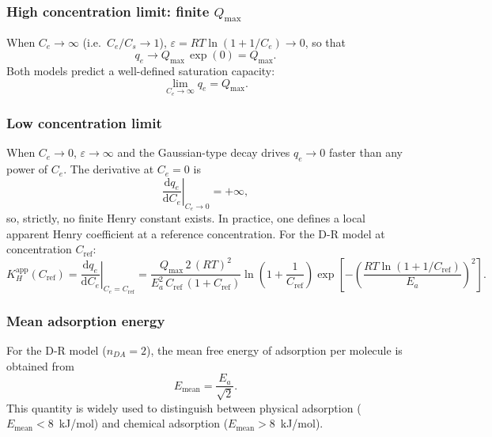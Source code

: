	\subsubsection{High concentration limit: finite $Q_{\max}$}

	When $C_e \to \infty$ (i.e.\ $C_e/C_s \to 1$),
	$\varepsilon = RT\ln(1 + 1/C_e) \to 0$, so that
	\begin{equation}
		q_e \to Q_{\max}\,\exp(0) = Q_{\max}.
	\end{equation}
	Both models predict a well-defined saturation capacity:
	\begin{equation}
		\boxed{\lim_{C_e \to \infty} q_e = Q_{\max}.}
	\end{equation}

	\subsubsection{Low concentration limit}

	When $C_e \to 0$, $\varepsilon \to \infty$ and the Gaussian-type
	decay drives $q_e \to 0$ faster than any power of $C_e$.  The
	derivative at $C_e = 0$ is
	\begin{equation}
		\left.\frac{\mathrm{d}q_e}{\mathrm{d}C_e}\right|_{C_e \to 0}
		= +\infty,
	\end{equation}
	so, strictly, no finite Henry constant exists.  In practice, one
	defines a local apparent Henry coefficient at a reference
	concentration.  For the D-R model at concentration $C_{\mathrm{ref}}$:
	\begin{equation}
		K_H^{\mathrm{app}}(C_{\mathrm{ref}})
		= \left.\frac{\mathrm{d}q_e}{\mathrm{d}C_e}
		\right|_{C_e = C_{\mathrm{ref}}}
		= \frac{Q_{\max}\,2\,(RT)^2}
		{E_a^2\, C_{\mathrm{ref}}\,(1 + C_{\mathrm{ref}})}
		\ln\!\left(1 + \frac{1}{C_{\mathrm{ref}}}\right)
		\exp\!\left[-\left(
		\frac{RT\ln(1 + 1/C_{\mathrm{ref}})}{E_a}
		\right)^{\!2}\right].
	\end{equation}

	\subsubsection{Mean adsorption energy}

	For the D-R model ($n_{DA} = 2$), the mean free energy of
	adsorption per molecule is obtained from
	\begin{equation}
		\boxed{E_{\mathrm{mean}} = \frac{E_a}{\sqrt{2}}.}
	\end{equation}
	This quantity is widely used to distinguish between physical
	adsorption ($E_{\mathrm{mean}} < 8$~kJ/mol) and chemical
	adsorption ($E_{\mathrm{mean}} > 8$~kJ/mol).

